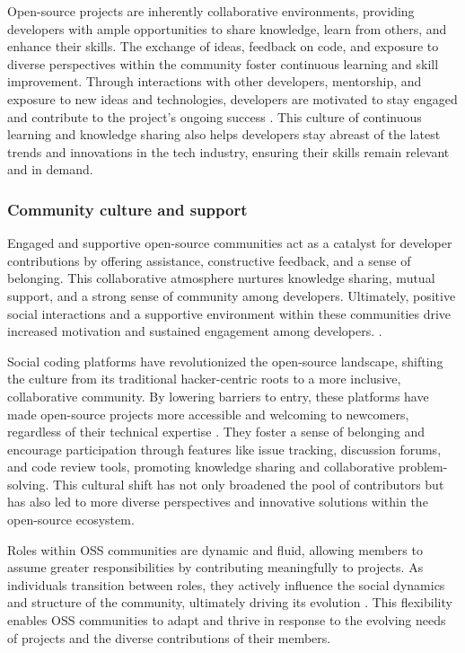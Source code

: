 Open-source projects are inherently collaborative environments, providing developers with ample opportunities to share knowledge, learn from others, and enhance their skills. The exchange of ideas, feedback on code, and exposure to diverse perspectives within the community foster continuous learning and skill improvement. Through interactions with other developers, mentorship, and exposure to new ideas and technologies, developers are motivated to stay engaged and contribute to the project's ongoing success \cite{05bitzer2007intrinsic,06ye2003toward,09lakhani2005hackers,13li2012leadership}. This culture of continuous learning and knowledge sharing also helps developers stay abreast of the latest trends and innovations in the tech industry, ensuring their skills remain relevant and in demand.


\subsubsection{Community culture and support }

Engaged and supportive open-source communities act as a catalyst for developer contributions by offering assistance, constructive feedback, and a sense of belonging. This collaborative atmosphere nurtures knowledge sharing, mutual support, and a strong sense of community among developers. Ultimately, positive social interactions and a supportive environment within these communities drive increased motivation and sustained engagement among developers. \cite{10wu2007empirical,12choi2015characteristics,13li2012leadership,16ke2008motivations}.

Social coding platforms have revolutionized the open-source landscape, shifting the culture from its traditional hacker-centric roots to a more inclusive, collaborative community. By lowering barriers to entry, these platforms have made open-source projects more accessible and welcoming to newcomers, regardless of their technical expertise \cite{06ye2003toward,11gerosa2021shifting}. They foster a sense of belonging and encourage participation through features like issue tracking, discussion forums, and code review tools, promoting knowledge sharing and collaborative problem-solving. This cultural shift has not only broadened the pool of contributors but has also led to more diverse perspectives and innovative solutions within the open-source ecosystem.

Roles within OSS communities are dynamic and fluid, allowing members to assume greater responsibilities by contributing meaningfully to projects. As individuals transition between roles, they actively influence the social dynamics and structure of the community, ultimately driving its evolution \cite{06ye2003toward}. This flexibility enables OSS communities to adapt and thrive in response to the evolving needs of projects and the diverse contributions of their members.


